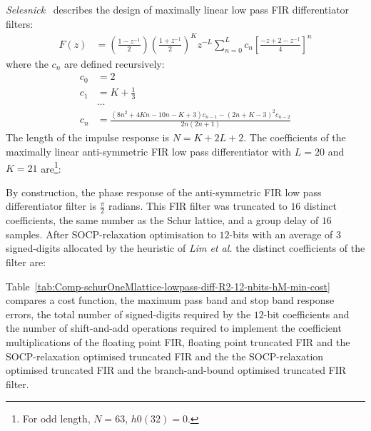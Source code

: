 \documentclass[a4paper,twoside,10pt,english]{article}
\begin{document}
\emph{Selesnick}~\cite{Selesnick_MaximallyFlatLowPassDigitalDifferentiators}
describes the design of maximally linear low pass FIR differentiator filters:
\begin{align*}
  F\left(z\right)&=\left(\frac{1-z^{-1}}{2}\right)
                   \left(\frac{1+z^{-1}}{2}\right)^{K}
                   z^{-L}\sum_{n=0}^{L}c_{n}\left[\frac{-z+2-z^{-1}}{4}\right]^{n}
\end{align*}
where the $c_{n}$ are defined recursively:
\begin{align*}
c_{0}&=2\\
c_{1}&=K+\frac{1}{3} \\
    & \hdots \\
c_{n}&=\frac{\left(8n^{2}+4Kn-10n-K+3\right)c_{n-1}-\left(2n+K-3\right)^{2}c_{n-2}}
       {2n\left(2n+1\right)}
\end{align*}
The length of the impulse response is $N=K+2L+2$. The coefficients of the maximally linear anti-symmetric FIR
low pass differentiator with $L=20$ and $K=21$ are\footnote{For odd length,
  $N=63$, $h0\left(32\right)=0$.}:
\begin{small}

\end{small}
By construction, the phase response of the anti-symmetric FIR low pass
differentiator filter is $\frac{\pi}{2}$ radians. This FIR filter was truncated
to $16$ distinct coefficients, the same number as the Schur lattice, and a group
delay of $16$ samples. After SOCP-relaxation optimisation to $12$-bits with an
average of $3$ signed-digits allocated by the heuristic of \emph{Lim et al.}
the distinct coefficients of the filter are:
\begin{small}

\end{small}

Table~\ref{tab:Comp-schurOneMlattice-lowpass-diff-R2-12-nbits-hM-min-cost}
compares a cost function, the maximum pass band and stop band response errors,
the total number of signed-digits required by the $12$-bit coefficients and the
number of shift-and-add operations required to implement the coefficient
multiplications of the floating point FIR, floating point truncated FIR and the
SOCP-relaxation optimised truncated FIR and the the SOCP-relaxation optimised
truncated FIR and the branch-and-bound optimised truncated FIR filter.
\end{document}
